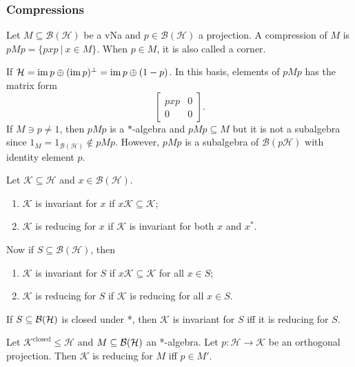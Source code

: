 \subsubsection*{Compressions}

\begin{definition}
  Let $M \subseteq \mathcal{B}(\mathcal{H})$ be a vNa and $p \in \mathcal{B}(\mathcal{H})$ a projection.
  A compression of $M$ is $p M p = \{pxp\ |\ x \in M\}$.
  When $p \in M$, it is also called a corner.
\end{definition}

If $\mathcal{H} = \operatorname{im} p \oplus (\operatorname{im} p)^{\perp} = \operatorname{im} p \oplus (1 - p)$.
In this basis, elements of $p M p$ has the matrix form 
$$\begin{bmatrix}
  pxp & 0\\
  0 & 0
\end{bmatrix}.$$
If $M \ni p \neq 1$, then $pMp$ is a $*$-algebra and $pMp \subseteq M$
but it is not a subalgebra since $1_{M} = 1 _{\mathcal{B}(\mathcal{H})} \notin pMp$.
However, $pM p$ is a subalgebra of $\mathcal{B}(p\mathcal{H})$ with identity element $p$. 

\begin{definition}
  Let $\mathcal{K} \subseteq \mathcal{H}$ and $x \in \mathcal{B}(\mathcal{H})$.
  \begin{enumerate}
    \item $\mathcal{K}$ is invariant for $x$ if $x \mathcal{K} \subseteq \mathcal{K}$;
    \item $\mathcal{K}$ is reducing for $x$ if $\mathcal{K}$ is invariant for both $x$ and $x^*$.
  \end{enumerate}
  Now if $S \subseteq \mathcal{B}(\mathcal{H})$, then 
  \begin{enumerate}
    \item $\mathcal{K}$ is invariant for $S$ if $x \mathcal{K} \subseteq \mathcal{K}$ for all $x \in S$;
    \item $\mathcal{K}$ is reducing for $S$ if $\mathcal{K}$ is reducing for all $x \in S$.
  \end{enumerate}
\end{definition}

If $S \subseteq \operatorname{\mathcal{B} (\mathcal{H})}$ is closed under *, then $\mathcal{K}$ is invariant for $S$ iff it is reducing for $S$. 

\begin{lemma}\label{lem:2}
  Let $\mathcal{K}^{\mathrm{closed}} \leq \mathcal{H}$ and $M \subseteq \operatorname{\mathcal{B} (\mathcal{H})}$ an *-algebra.
  Let $p: \mathcal{H} \to \mathcal{K}$ be an orthogonal projection. Then $\mathcal{K}$ is reducing for $M$ iff $p \in M'$.
\end{lemma}

